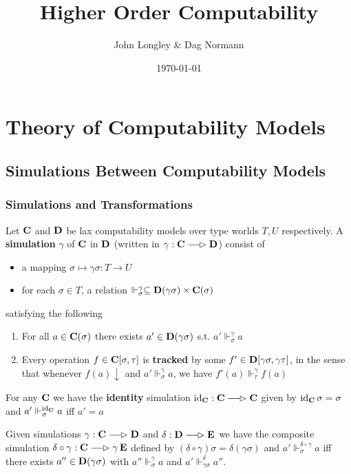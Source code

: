 \documentclass[11pt]{article}
\author{John Longley \& Dag Normann}
\date{\today}
\title{Higher Order Computability}
\begin{document}
\maketitle
\tableofcontents


\section{Theory of Computability Models}
\label{sec:orgb3afb28}
\subsection{Simulations Between Computability Models}
\label{sec:org88e2d1f}
\subsubsection{Simulations and Transformations}
\label{sec:org3d5c168}
\begin{definition}[]
Let \(\operatorname{\textbf{C}}\) and \(\operatorname{\textbf{D}}\) be lax computability models over type worlds \(T,U\) respectively. A
\textbf{simulation} \(\gamma\) of \(\operatorname{\textbf{C}}\) in \(\operatorname{\textbf{D}}\) (written in \(\gamma:\bC\lrarhd\bD\))
consist of
\begin{itemize}
\item a mapping \(\sigma\mapsto\gamma\sigma:T\to U\)
\item for each \(\sigma\in T\), a relation \(\Vdash_\sigma^\gamma\subseteq\operatorname{\textbf{D}}(\gamma\sigma)\times\operatorname{\textbf{C}}(\sigma)\)
\end{itemize}
satisfying the following
\begin{enumerate}
\item For all \(a\in\operatorname{\textbf{C}}(\sigma)\) there exists \(a'\in\operatorname{\textbf{D}}(\gamma\sigma)\) s.t. \(a'\Vdash_\sigma^\gamma a\)
\item Every operation \(f\in\operatorname{\textbf{C}}[\sigma,\tau]\) is \textbf{tracked} by some \(f'\in\operatorname{\textbf{D}}[\gamma\sigma,\gamma\tau]\), in the sense that
whenever \(f(a)\downarrow\) and \(a'\Vdash_\sigma^\gamma a\), we have \(f'(a)\Vdash_\tau^\gamma f(a)\)
\end{enumerate}
\end{definition}

For any \(\operatorname{\textbf{C}}\) we have the \textbf{identity} simulation \(\id_{\bC}:\bC\lrarhd\bC\) given by \(\operatorname{id}_{\operatorname{\textbf{C}}}\sigma=\sigma\)
and \(a'\Vdash_{\sigma}^{\operatorname{id}_{\operatorname{\textbf{C}}}}a\) iff \(a'=a\)

Given simulations \(\gamma:\bC\lrarhd\bD\) and \(\delta:\bD\lrarhd\bE\) we have the composite
simulation \(\delta\circ\gamma:\bC\lrarhd\gamma\bE\) defined by \((\delta\circ\gamma)\sigma=\delta(\gamma\sigma)\) and \(a'\Vdash_\sigma^{\delta\circ\gamma}a\)  iff there
exists \(a''\in\operatorname{\textbf{D}}(\gamma\sigma)\) with \(a''\Vdash_\sigma^\gamma a\) and \(a'\Vdash_{\gamma\sigma}^\delta a''\).
\end{document}
